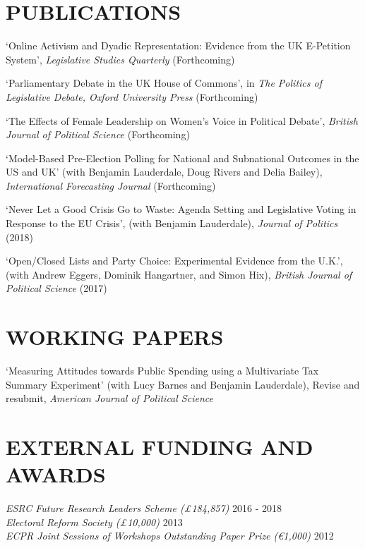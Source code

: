\documentclass[centered]{res}
\begin{document}
\begin{resume}
\section{PUBLICATIONS} 

`Online Activism and Dyadic Representation: Evidence from the UK E-Petition System', \emph{Legislative Studies Quarterly} (Forthcoming)

`Parliamentary Debate in the UK House of Commons', in \emph{The Politics of Legislative Debate, Oxford University Press} (Forthcoming)

`The Effects of Female Leadership on Women's Voice in Political Debate', \emph{British Journal of Political Science} (Forthcoming)

`Model-Based Pre-Election Polling for National and Subnational Outcomes in the US and UK' (with Benjamin Lauderdale, Doug Rivers and Delia Bailey), \emph{International Forecasting Journal} (Forthcoming)

`Never Let a Good Crisis Go to Waste: Agenda Setting and Legislative Voting in Response to the EU Crisis', (with Benjamin Lauderdale), \emph{Journal of Politics} (2018)

`Open/Closed Lists and Party Choice: Experimental Evidence from the U.K.', (with Andrew Eggers, Dominik Hangartner, and Simon Hix), \emph{British Journal of Political Science} (2017)

\section{WORKING PAPERS} 

`Measuring Attitudes towards Public Spending using a Multivariate Tax Summary Experiment'
(with Lucy Barnes and Benjamin Lauderdale), Revise and resubmit, \emph{American Journal of Political Science}




\section{EXTERNAL FUNDING AND AWARDS}  {
{\sl ESRC Future Research Leaders Scheme (\pounds 184,857)} \hfill 2016 - 2018 \\
{\sl Electoral Reform Society (\pounds 10,000)} \hfill 2013 \\
{\sl ECPR Joint Sessions of Workshops Outstanding Paper Prize (\euro 1,000)} \hfill 2012 \\
}
\end{resume}
\end{document}
